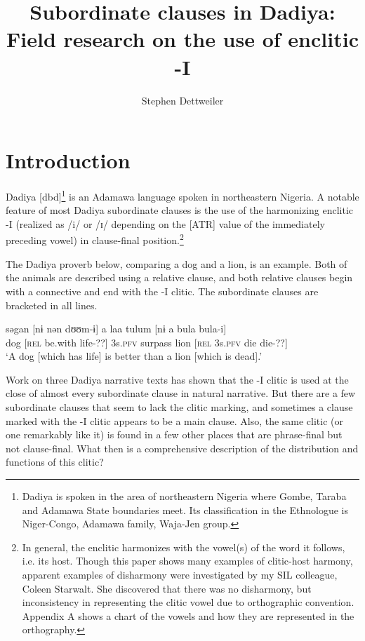 \documentclass[output=paper]{langscibook}
\author{Stephen Dettweiler\affiliation{SIL International}}
\title{Subordinate clauses in Dadiya: Field research on the use of enclitic -I}
\begin{document}
\maketitle

\section{Introduction}

Dadiya [dbd]\footnote{Dadiya is spoken in the area of northeastern Nigeria where Gombe, Taraba and Adamawa State boundaries meet. Its classification in the Ethnologue \citep{EberhardFennig2019} is Niger-Congo, Adamawa family, Waja-Jen group.} is an Adamawa language spoken in northeastern Nigeria. A notable feature of most Dadiya subordinate clauses is the use of the harmonizing enclitic -I (realized as /i/ or /ɪ/ depending on the [ATR] value of the immediately preceding vowel) in clause-final position.\footnote{In general, the enclitic harmonizes with the vowel(s) of the word it follows, i.e. its host. Though this paper shows many examples of clitic-host harmony, apparent examples of disharmony were investigated by my SIL colleague, Coleen Starwalt. She discovered that there was no disharmony, but inconsistency in representing the clitic vowel due to orthographic convention. Appendix A shows a chart of the vowels and how they are represented in the orthography.}

The Dadiya proverb below, comparing a dog and a lion, is an example. Both of the animals are described using a relative clause, and both relative clauses begin with a connective and end with the -I clitic. The subordinate clauses are bracketed in all lines.

\ea
\gll səgan [nɨ nən dʊʊm-ɨ] a laa tulum [nɨ a bula bula-i]\\
dog [\textsc{rel} be.with life-??] 3s.\textsc{pfv} surpass lion [\textsc{rel} 3s.\textsc{pfv} die die-??]\\
\glt `A dog [which has life] is better than a lion [which is dead].'
\z

Work on three Dadiya narrative texts has shown that the -I clitic is used at the close of almost every subordinate clause in natural narrative. But there are a few subordinate clauses that seem to lack the clitic marking, and sometimes a clause marked with the -I clitic appears to be a main clause. Also, the same clitic (or one remarkably like it) is found in a few other places that are phrase-final but not clause-final. What then is a comprehensive description of the distribution and functions of this clitic?
\end{document}
